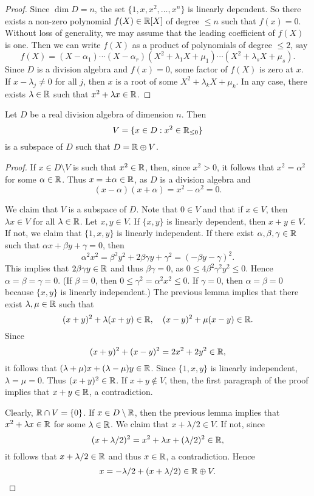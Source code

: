 \begin{proof}
	Since $\dim D=n$, the set $\{1,x,x^2,\dots,x^n\}$ is linearly dependent. So
	there exists a non-zero polynomial $f(X)\in\mathbb{R}[X]$ of degree $\leq n$ such
	that $f(x)=0$. Without loss of generality, we may assume that the leading
	coefficient of $f(X)$ is one. Then we can write $f(X)$ as a product of
	polynomials of degree $\leq2$, say 
	\[
		f(X)=(X-\alpha_1)\cdots (X-\alpha_r)(X^2+\lambda_1 X+\mu_1)\cdots (X^2+\lambda_s X+\mu_s).
	\]
	Since $D$ is a division algebra and $f(x)=0$, some factor of $f(X)$ is
	zero at $x$. If $x-\lambda_j\ne 0$ for all $j$, then $x$ is a root of some
	$X^2+\lambda_k X+\mu_k$. In any case, there exists $\lambda\in\mathbb{R}$ such that
	$x^2+\lambda x\in\mathbb{R}$. 
\end{proof}

\begin{lemma}
	\label{lem:trick_frobenius2}
	Let $D$ be a real division algebra of dimension $n$. Then
	\[
		V=\{x\in D:x^2\in\mathbb{R}_{\leq0}\}
	\]
	is a subspace of $D$ such that $D=\mathbb{R}\oplus V$.
\end{lemma}

\begin{proof}
	If $x\in D\setminus V$ is such that $x^2\in\mathbb{R}$, 
    then, since $x^2>0$, it follows
	that $x^2=\alpha^2$ for some $\alpha\in\mathbb{R}$. Thus $x=\pm\alpha\in\mathbb{R}$, as $D$
	is a division algebra and 
 \[
 (x-\alpha)(x+\alpha)=x^2-\alpha^2=0.
 \]

	We claim that $V$ is a subspace of $D$.  Note that $0\in V$ and 
	that if $x\in V$, then $\lambda x\in V$ for all $\lambda\in\mathbb{R}$.  Let 
	$x,y\in V$. If $\{x,y\}$ is linearly dependent, then $x+y\in V$.
	If not, we claim that 
	$\{1,x,y\}$ is linearly independent. If there exist 
	$\alpha,\beta,\gamma\in\mathbb{R}$ such that $\alpha x+\beta y+\gamma=0$, then 
	\[
	\alpha^2x^2=\beta^2y^2+2\beta\gamma y+\gamma^2=(-\beta y-\gamma)^2.
	\]
	This implies that $2\beta\gamma y\in\mathbb{R}$ and thus $\beta\gamma=0$, as
        $0\leq 4\beta^2\gamma^2y^2\leq 0$. Hence 
	$\alpha=\beta=\gamma=0$. (If $\beta=0$, then $0\leq\gamma^2=\alpha^2x^2\leq 0$. If $\gamma=0$, then $\alpha=\beta=0$ because $\{x,y\}$ is linearly independent.) The previous lemma implies that there exist 
	$\lambda,\mu\in\mathbb{R}$ such that 
	\[
		(x+y)^2+\lambda(x+y)\in\mathbb{R},\quad
		(x-y)^2+\mu(x-y)\in\mathbb{R}.
	\]
	Since 
	\[
		(x+y)^2+(x-y)^2=2x^2+2y^2\in\mathbb{R},
	\]
	it follows that $(\lambda+\mu)x+(\lambda-\mu)y\in\mathbb{R}$. Since  $\{1,x,y\}$ is linearly 
	independent, 
	$\lambda=\mu=0$. Thus $(x+y)^2\in\mathbb{R}$. If 
	$x+y\not\in V$, then, the first paragraph of the proof implies that 
	$x+y\in\mathbb{R}$, a contradiction. 

	Clearly, $\mathbb{R}\cap V=\{0\}$. If $x\in D\setminus\mathbb{R}$, then the previous lemma 
	implies that $x^2+\lambda x\in\mathbb{R}$ for some 
	$\lambda\in\mathbb{R}$. We claim that $x+\lambda/2\in V$. If not, since 
	\[
	(x+\lambda/2)^2=x^2+\lambda x+(\lambda/2)^2\in\mathbb{R},
	\]
	it follows that $x+\lambda/2\in\mathbb{R}$ and thus $x\in\mathbb{R}$, a contradiction. Hence 
	\[
 x=-\lambda/2+(x+\lambda/2)\in\mathbb{R}\oplus V.\qedhere
 \]
\end{proof}

